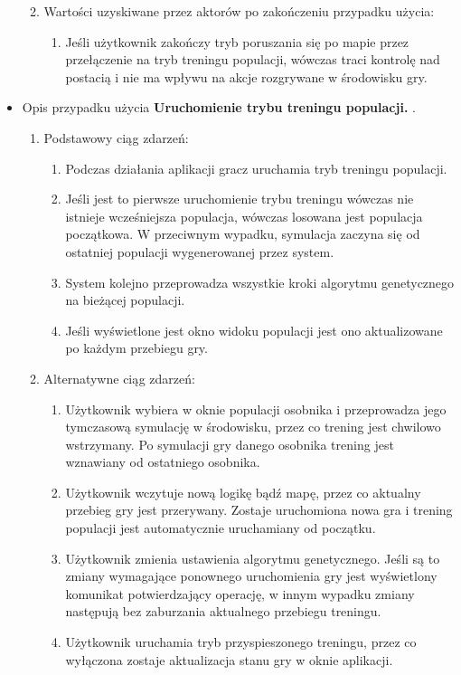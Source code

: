 \begin{par}
\begin{itemize}
\begin{enumerate}
\begin{enumerate}
		\end{enumerate}
	\item Wartości uzyskiwane przez aktorów po zakończeniu przypadku użycia:
		\begin{enumerate}
		\item Jeśli użytkownik zakończy tryb poruszania się po mapie przez przełączenie na tryb treningu populacji, wówczas traci kontrolę nad postacią i nie ma wpływu na akcje rozgrywane w środowisku gry.
		\end{enumerate}
	\end{enumerate}
	\item
	Opis przypadku użycia {\bf Uruchomienie trybu treningu populacji. }.
	\begin{enumerate}
	\item Podstawowy ciąg zdarzeń:
		\begin{enumerate}
		\item Podczas działania aplikacji gracz uruchamia tryb treningu populacji.
		\item Jeśli jest to pierwsze uruchomienie trybu treningu wówczas nie istnieje wcześniejsza populacja, wówczas losowana jest populacja początkowa. W przeciwnym wypadku, symulacja zaczyna się od ostatniej populacji wygenerowanej przez system. 
		\item System kolejno przeprowadza wszystkie kroki algorytmu genetycznego na bieżącej populacji.
		\item Jeśli wyświetlone jest okno widoku populacji jest ono aktualizowane po każdym przebiegu gry.
		\end{enumerate}
	\item Alternatywne ciąg zdarzeń:
		\begin{enumerate}
		\item Użytkownik wybiera w oknie populacji osobnika i przeprowadza jego tymczasową symulację w środowisku, przez co trening jest chwilowo wstrzymany. Po symulacji gry danego osobnika trening jest wznawiany od ostatniego osobnika.
		\item Użytkownik wczytuje nową logikę bądź mapę, przez co aktualny przebieg gry jest przerywany. Zostaje uruchomiona nowa gra i trening populacji jest automatycznie uruchamiany od początku.
		\item Użytkownik zmienia ustawienia algorytmu genetycznego. Jeśli są to zmiany wymagające ponownego uruchomienia gry jest wyświetlony komunikat potwierdzający operację, w innym wypadku zmiany następują bez zaburzania aktualnego przebiegu treningu.
		\item Użytkownik uruchamia tryb przyspieszonego treningu, przez co wyłączona zostaje aktualizacja stanu gry w oknie aplikacji.

\end{enumerate}
\end{enumerate}
\end{itemize}
\end{par}
